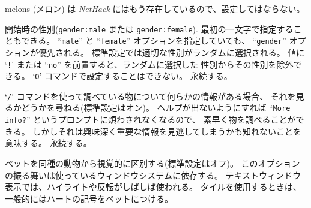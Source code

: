 melons (メロン) は {\it NetHack\/} にはもう存在しているので、設定してはならない。
\item[\ib{gender}]
開始時の性別({\tt gender:male} または {\tt gender:female}).
最初の一文字で指定することもできる。
``{\tt male}'' と ``{\tt female}'' オプションを指定していても、
``{\tt gender}'' オプションが優先される。
標準設定では適切な性別がランダムに選択される。
値に `{\tt !}' または ``{\tt no}'' を前置すると、ランダムに選択した
性別からその性別を除外できる。
`{\tt O}' コマンドで設定することはできない。
永続する。
\item[\ib{help}]
`{\tt /}' コマンドを使って調べている物について何らかの情報がある場合、
それを見るかどうかを尋ねる(標準設定はオン)。
ヘルプが出ないようにすれば ``{\tt More info?}'' というプロンプトに煩わされなくなるので、
素早く物を調べることができる。
しかしそれは興味深く重要な情報を見逃してしまうかも知れないことを意味する。
永続する。
\item[\ib{hilite\verb+_+pet}]
ペットを同種の動物から視覚的に区別する(標準設定はオフ)。
このオプションの振る舞いは使っているウィンドウシステムに依存する。
テキストウィンドウ表示では、ハイライトや反転がしばしば使われる。
タイルを使用するときは、一般的にはハートの記号をペットにつける。
\item[\ib{hilite\verb+_+pile}]
